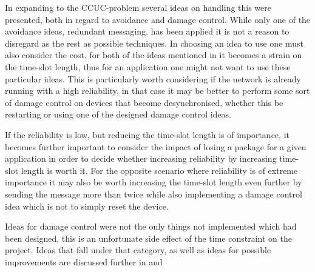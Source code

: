\bigskip \noindent
In expanding to the CCUC-problem several ideas on handling this were presented, both in regard to avoidance and damage control.
While only one of the avoidance ideas, redundant messaging, has been applied it is not a reason to disregard as the rest as possible techniques.
In choosing an idea to use one must also consider the cost, for both of the ideas mentioned in  it becomes a strain on the time-slot length, thus for an application one might not want to use these particular ideas.
This is particularly worth considering if the network is already running with a high reliability, in that case it may be better to perform some sort of damage control on devices that become desynchronised, whether this be restarting or using one of the designed damage control ideas. 

If the reliability is low, but reducing the time-slot length is of importance, it becomes further important to consider the impact of losing a package for a given application in order to decide whether increasing reliability by increasing time-slot length is worth it.
For the opposite scenario where reliability is of extreme importance it may also be worth increasing the time-slot length even further by sending the message more than twice while also implementing a damage control idea which is not to simply reset the device.

\bigskip \noindent
Ideas for damage control were not the only things not implemented which had been designed, this is an unfortunate side effect of the time constraint on the project.
Ideas that fall under that category, as well as ideas for possible improvements are discussed further in  and 